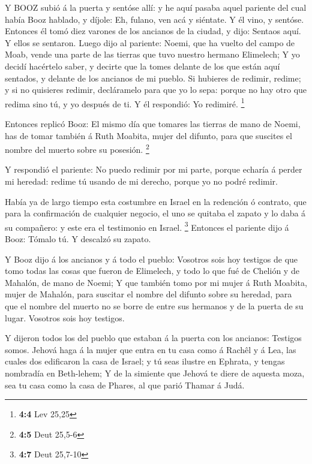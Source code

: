  Y BOOZ subió á la puerta y sentóse allí: y he aquí pasaba
aquel pariente del cual había Booz hablado, y díjole: Eh, fulano, ven
acá y siéntate. Y él vino, y sentóse.  Entonces él tomó diez
varones de los ancianos de la ciudad, y dijo: Sentaos aquí. Y ellos se
sentaron.  Luego dijo al pariente: Noemi, que ha vuelto del
campo de Moab, vende una parte de las tierras que tuvo nuestro hermano
Elimelech;  Y yo decidí hacértelo saber, y decirte que la
tomes delante de los que están aquí sentados, y delante de los ancianos
de mi pueblo. Si hubieres de redimir, redime; y si no quisieres redimir,
decláramelo para que yo lo sepa: porque no hay otro que redima sino tú,
y yo después de ti. Y él respondió: Yo redimiré. \footnote{\textbf{4:4}
  Lev 25,25}

 Entonces replicó Booz: El mismo día que tomares las tierras
de mano de Noemi, has de tomar también á Ruth Moabita, mujer del
difunto, para que suscites el nombre del muerto sobre su posesión.
\footnote{\textbf{4:5} Deut 25,5-6}

 Y respondió el pariente: No puedo redimir por mi parte,
porque echaría á perder mi heredad: redime tú usando de mi derecho,
porque yo no podré redimir.

 Había ya de largo tiempo esta costumbre en Israel en la
redención ó contrato, que para la confirmación de cualquier negocio, el
uno se quitaba el zapato y lo daba á su compañero: y este era el
testimonio en Israel. \footnote{\textbf{4:7} Deut 25,7-10} 
Entonces el pariente dijo á Booz: Tómalo tú. Y descalzó su zapato.

 Y Booz dijo á los ancianos y á todo el pueblo: Vosotros
sois hoy testigos de que tomo todas las cosas que fueron de Elimelech, y
todo lo que fué de Chelión y de Mahalón, de mano de Noemi; 
Y que también tomo por mi mujer á Ruth Moabita, mujer de Mahalón, para
suscitar el nombre del difunto sobre su heredad, para que el nombre del
muerto no se borre de entre sus hermanos y de la puerta de su lugar.
Vosotros sois hoy testigos.

 Y dijeron todos los del pueblo que estaban á la puerta con
los ancianos: Testigos somos. Jehová haga á la mujer que entra en tu
casa como á Rachêl y á Lea, las cuales dos edificaron la casa de Israel;
y tú seas ilustre en Ephrata, y tengas nombradía en Beth-lehem;
 Y de la simiente que Jehová te diere de aquesta moza, sea
tu casa como la casa de Phares, al que parió Thamar á Judá.

